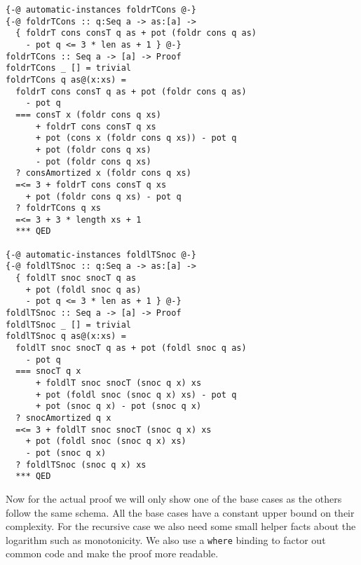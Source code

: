 \documentclass[sigplan,screen]{acmart}
\begin{document}
\begin{lstlisting}
{-@ automatic-instances foldrTCons @-}
{-@ foldrTCons :: q:Seq a -> as:[a] ->
  { foldrT cons consT q as + pot (foldr cons q as)
    - pot q <= 3 * len as + 1 } @-}
foldrTCons :: Seq a -> [a] -> Proof
foldrTCons _ [] = trivial
foldrTCons q as@(x:xs) =
  foldrT cons consT q as + pot (foldr cons q as)
    - pot q
  === consT x (foldr cons q xs)
      + foldrT cons consT q xs
      + pot (cons x (foldr cons q xs)) - pot q
      + pot (foldr cons q xs)
      - pot (foldr cons q xs)
  ? consAmortized x (foldr cons q xs)
  =<= 3 + foldrT cons consT q xs
    + pot (foldr cons q xs) - pot q
  ? foldrTCons q xs
  =<= 3 + 3 * length xs + 1
  *** QED

{-@ automatic-instances foldlTSnoc @-}
{-@ foldlTSnoc :: q:Seq a -> as:[a] ->
  { foldlT snoc snocT q as
    + pot (foldl snoc q as)
    - pot q <= 3 * len as + 1 } @-}
foldlTSnoc :: Seq a -> [a] -> Proof
foldlTSnoc _ [] = trivial
foldlTSnoc q as@(x:xs) =
  foldlT snoc snocT q as + pot (foldl snoc q as)
    - pot q
  === snocT q x
      + foldlT snoc snocT (snoc q x) xs
      + pot (foldl snoc (snoc q x) xs) - pot q
      + pot (snoc q x) - pot (snoc q x)
  ? snocAmortized q x
  =<= 3 + foldlT snoc snocT (snoc q x) xs
    + pot (foldl snoc (snoc q x) xs)
    - pot (snoc q x)
  ? foldlTSnoc (snoc q x) xs
  *** QED
\end{lstlisting}

Now for the actual proof we will only show one of the base cases as the others follow the same schema. All the base cases have a constant upper bound on their complexity. For the recursive case we also need some small helper facts about the logarithm such as monotonicity. We also use a \texttt{where} binding to factor out common code and make the proof more readable.
\end{document}
